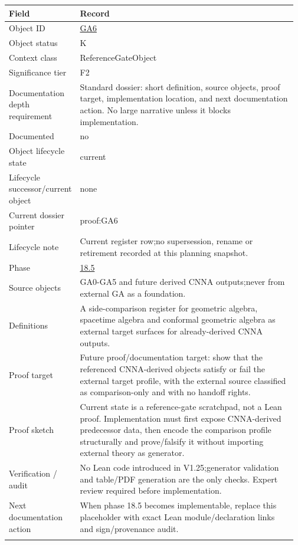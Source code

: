 \begin{longtable}{L{0.16\linewidth} L{0.81\linewidth}}
\hline
\textbf{Field} & \textbf{Record}\\
\hline
Object ID & \hyperlink{object-row-GA6}{GA6}\\
\hline\addlinespace[0.20em]
Object status & K\\
\hline\addlinespace[0.20em]
Context class & ReferenceGateObject\\
\hline\addlinespace[0.20em]
Significance tier & F2\\
\hline\addlinespace[0.20em]
Documentation depth requirement & Standard dossier: short definition, source objects, proof target, implementation location, and next documentation action. No large narrative unless it blocks implementation.\\
\hline\addlinespace[0.20em]
Documented & no\\
\hline\addlinespace[0.20em]
Object lifecycle state & current\\
\hline\addlinespace[0.20em]
Lifecycle successor/\allowbreak{}current object & none\\
\hline\addlinespace[0.20em]
Current dossier pointer & proof:GA6\\
\hline\addlinespace[0.20em]
Lifecycle note & Current register row;\newline no supersession, rename or retirement recorded at this planning snapshot.\\
\hline\addlinespace[0.20em]
Phase & \hyperlink{phase-row-18-5}{18.5}\\
\hline\addlinespace[0.20em]
Source objects & GA0-GA5 and future derived CNNA outputs;\newline never from external GA as a foundation.\\
\hline\addlinespace[0.20em]
Definitions & A side-comparison register for geometric algebra, spacetime algebra and conformal geometric algebra as external target surfaces for already-derived CNNA outputs.\\
\hline\addlinespace[0.20em]
Proof target & Future proof/\allowbreak{}documentation target: show that the referenced CNNA-derived objects satisfy or fail the external target profile, with the external source classified as comparison-only and with no handoff rights.\\
\hline\addlinespace[0.20em]
Proof sketch & Current state is a reference-gate scratchpad, not a Lean proof. Implementation must first expose CNNA-derived predecessor data, then encode the comparison profile structurally and prove/\allowbreak{}falsify it without importing external theory as generator.\\
\hline\addlinespace[0.20em]
Verification /\allowbreak{} audit & No Lean code introduced in V1.25;\newline generator validation and table/\allowbreak{}PDF generation are the only checks. Expert review required before implementation.\\
\hline\addlinespace[0.20em]
Next documentation action & When phase 18.5 becomes implementable, replace this placeholder with exact Lean module/\allowbreak{}declaration links and sign/\allowbreak{}provenance audit.\\
\hline\addlinespace[0.20em]
\end{longtable}
